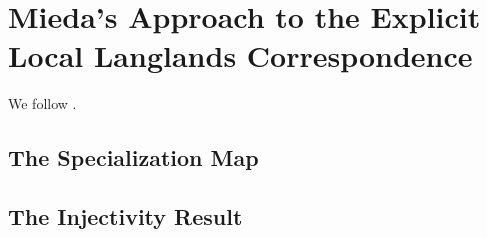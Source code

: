 \documentclass[../main.tex]{subfiles}
\begin{document}
\section{Mieda's Approach to the Explicit Local Langlands Correspondence} %
\label{sec:Mieda's Approach to the Explicit Local Langlands Correspondence}
We follow \cite{mieda2016geometric}.

\subsection{The Specialization Map} %
\label{sub:The Specialization Map}


\subsection{The Injectivity Result} %
\label{sub:The Injectivity Result}


\end{document}
